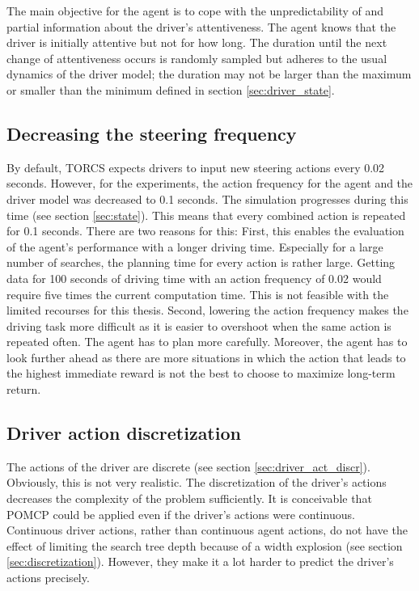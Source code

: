 The main objective for the agent is to cope with the unpredictability of and partial information about the driver's attentiveness. The agent knows that the driver is initially attentive but not for how long. The duration until the next change of attentiveness occurs is randomly sampled but adheres to the usual dynamics of the driver model; the duration may not be larger than the maximum or smaller than the minimum defined in section \ref{sec:driver_state}.

\subsection{Decreasing the steering frequency}

By default, TORCS expects drivers to input new steering actions every 0.02 seconds. However, for the experiments, the action frequency for the agent and the driver model was decreased to 0.1 seconds. The simulation progresses during this time (see section \ref{sec:state}). This means that every combined action is repeated for 0.1 seconds. There are two reasons for this: First, this enables the evaluation of the agent's performance with a longer driving time. Especially for a large number of searches, the planning time for every action is rather large. Getting data for 100 seconds of driving time with an action frequency of 0.02 would require five times the current computation time. This is not feasible with the limited recourses for this thesis. Second, lowering the action frequency makes the driving task more difficult as it is easier to overshoot when the same action is repeated often. The agent has to plan more carefully.  Moreover, the agent has to look further ahead as there are more situations in which the action that leads to the highest immediate reward is not the best to choose to maximize long-term return.

\subsection{Driver action discretization}

The actions of the driver are discrete (see section \ref{sec:driver_act_discr}). Obviously, this is not very realistic. The discretization of the driver's actions decreases the complexity of the problem sufficiently. It is conceivable that POMCP could be applied even if the driver's actions were continuous. Continuous driver actions, rather than continuous agent actions, do not have the effect of limiting the search tree depth because of a width explosion (see section \ref{sec:discretization}). However, they make it a lot harder to predict the driver's actions precisely.

